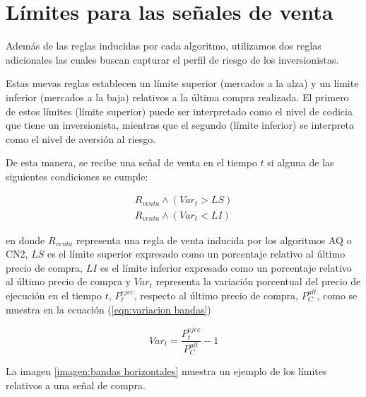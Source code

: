 \documentclass[12pt]{scrbook}
\theoremstyle{break}
\theoremstyle{break}
\begin{document}
\section{Límites para las señales de venta}
\label{seccion:limites ventas}
Además de las reglas inducidas por cada algoritmo, utilizamos dos reglas adicionales las cuales buscan capturar el perfil de riesgo de los inversionistas.

Estas nuevas reglas establecen un límite superior (mercados a la alza) y un límite inferior (mercados a la baja) relativos a la última compra realizada. El primero de estos límites (límite superior) puede ser interpretado como el nivel de codicia que tiene un inversionista, mientras que el segundo (límite inferior) se interpreta como el nivel de aversión al riesgo.

De esta manera, se recibe una señal de venta en el tiempo $t$ si alguna de las siguientes condiciones se cumple:

\begin{align}
R_{venta} \wedge (Var_{t} > LS) \label{eqn:Venta limite sup}\\
R_{venta} \wedge (Var_{t} < LI) \label{eqn:Venta limite inf}
\end{align}

en donde $R_{venta}$ representa una regla de venta inducida por los algoritmos AQ o CN2, $LS$ es el límite superior expresado como un porcentaje relativo al último precio de compra, $LI$ es el límite inferior expresado como un porcentaje relativo al último precio de compra y $Var_{t}$ representa la variación porcentual del precio de ejecución en el tiempo $t$, $P_{t}^{ejec}$, respecto al último precio de compra, $P_{C}^{ult}$, como se muestra en la ecuación (\ref{eqn:variacion bandas})

\begin{equation} \label{eqn:variacion bandas}
Var_{t} = \dfrac{P_{t}^{ejec}}{P_{C}^{ult}} - 1
\end{equation}

La imagen \ref{imagen:bandas horizontales} muestra un ejemplo de los límites relativos a una señal de compra.
\end{document}
